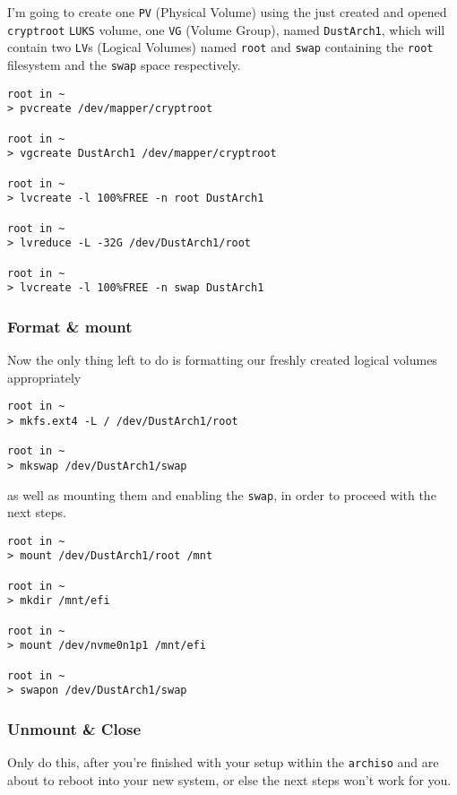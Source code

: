 \documentclass[10pt]{dustdoc}
\begin{document}
I’m going to create one \texttt{PV} (Physical Volume) using the just created and opened \texttt{cryptroot} \texttt{LUKS} volume, one \texttt{VG} (Volume Group), named \texttt{DustArch1}, which will contain two \texttt{LV}s (Logical Volumes) named \texttt{root} and \texttt{swap} containing the \texttt{root} filesystem and the \texttt{swap} space respectively.

\begin{verbatim}
root in ~
> pvcreate /dev/mapper/cryptroot

root in ~
> vgcreate DustArch1 /dev/mapper/cryptroot

root in ~
> lvcreate -l 100%FREE -n root DustArch1

root in ~
> lvreduce -L -32G /dev/DustArch1/root

root in ~
> lvcreate -l 100%FREE -n swap DustArch1
\end{verbatim}

\subsubsection{Format \& mount}%
\label{sec:format-and-mount}

Now the only thing left to do is formatting our freshly created logical volumes appropriately

\begin{verbatim}
root in ~
> mkfs.ext4 -L / /dev/DustArch1/root

root in ~
> mkswap /dev/DustArch1/swap
\end{verbatim}

\noindent
as well as mounting them and enabling the \texttt{swap}, in order to proceed with the next steps.

\begin{verbatim}
root in ~
> mount /dev/DustArch1/root /mnt

root in ~
> mkdir /mnt/efi

root in ~
> mount /dev/nvme0n1p1 /mnt/efi

root in ~
> swapon /dev/DustArch1/swap
\end{verbatim}

\subsubsection{Unmount \& Close}%
\label{sec:unmount-and-close}

\begin{WARNING}
    Only do this, after you’re finished with your setup within the \texttt{archiso} and are about to reboot into your new system, or else the next steps won’t work for you.
\end{WARNING}
\end{document}
